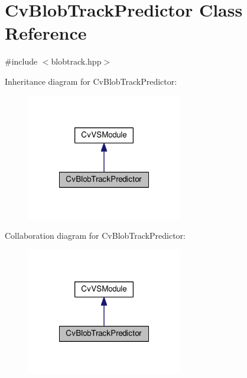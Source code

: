 \hypertarget{classCvBlobTrackPredictor}{\section{Cv\-Blob\-Track\-Predictor Class Reference}
\label{classCvBlobTrackPredictor}
}


{\ttfamily \#include $<$blobtrack.\-hpp$>$}



Inheritance diagram for Cv\-Blob\-Track\-Predictor\-:\nopagebreak
\begin{figure}[H]
\begin{center}
\leavevmode
\includegraphics[width=192pt]{classCvBlobTrackPredictor__inherit__graph}
\end{center}
\end{figure}


Collaboration diagram for Cv\-Blob\-Track\-Predictor\-:\nopagebreak
\begin{figure}[H]
\begin{center}
\leavevmode
\includegraphics[width=192pt]{classCvBlobTrackPredictor__coll__graph}
\end{center}
\end{figure}
